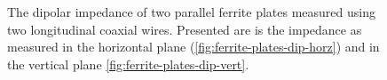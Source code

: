 \begin{figure}
\label{fig:ferrite-plates-dipolar}
\caption{The dipolar impedance of two parallel ferrite plates measured using two longitudinal coaxial wires. Presented are is the impedance as measured in the horizontal plane (\ref{fig:ferrite-plates-dip-horz}) and in the vertical plane \ref{fig:ferrite-plates-dip-vert}.}
\end{figure}

